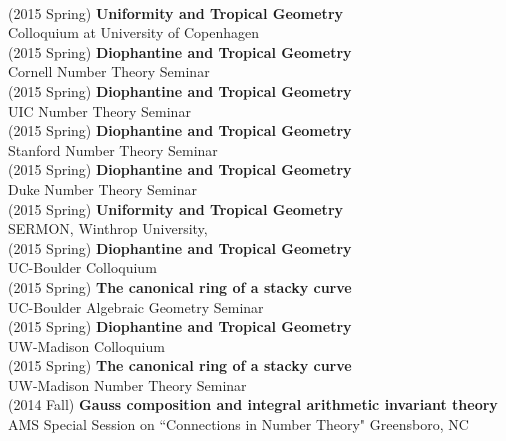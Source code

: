 \documentclass[margin,line]{res}
\begin{document}
\begin{resume}
\vspace{.05cm}\\
(2015 Spring) \textbf{Uniformity and Tropical Geometry}\\
Colloquium at University of Copenhagen
\vspace{.05cm}\\
(2015 Spring) \textbf{Diophantine and Tropical Geometry}\\
Cornell Number Theory Seminar
\vspace{.05cm}\\
(2015 Spring) \textbf{Diophantine and Tropical Geometry}\\
UIC Number Theory Seminar
\vspace{.05cm}\\
(2015 Spring) \textbf{Diophantine and Tropical Geometry}\\
Stanford Number Theory Seminar
\vspace{.05cm}\\
(2015 Spring) \textbf{Diophantine and Tropical Geometry}\\
Duke Number Theory Seminar
\vspace{.05cm}\\
(2015 Spring) \textbf{Uniformity and Tropical Geometry}\\
SERMON, Winthrop University, 
\vspace{.05cm}\\
(2015 Spring) \textbf{Diophantine and Tropical Geometry}\\
UC-Boulder Colloquium
\vspace{.05cm}\\
(2015 Spring) \textbf{The canonical ring of a stacky curve}\\  
UC-Boulder Algebraic Geometry Seminar
\vspace{.05cm}\\
(2015 Spring) \textbf{Diophantine and Tropical Geometry}\\
UW-Madison Colloquium
\vspace{.05cm}\\
(2015 Spring) \textbf{The canonical ring of a stacky curve}\\  
UW-Madison Number Theory Seminar
\vspace{.05cm}\\
(2014 Fall) \textbf{Gauss composition and integral arithmetic invariant theory}\\  
AMS Special Session on  ``Connections in Number Theory" Greensboro, NC
\vspace{.05cm}\\

\end{resume}
\end{document}

